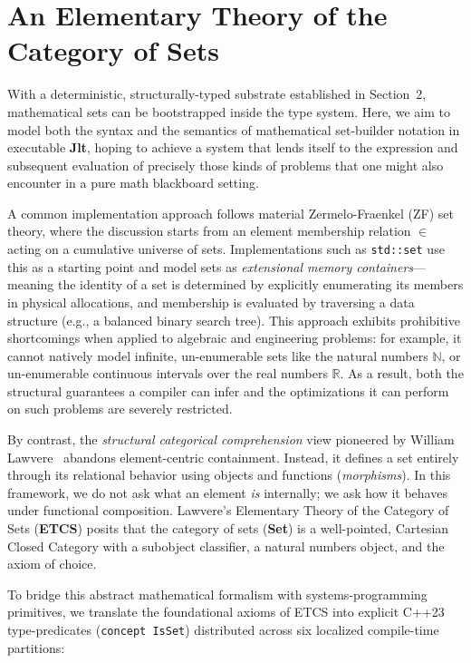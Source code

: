 \section{An Elementary Theory of the Category of Sets}
\label{sec:etcs}

With a deterministic, structurally-typed substrate established in Section~2, mathematical sets can be bootstrapped inside the type system. Here, we aim to model both the syntax and the semantics of mathematical set-builder notation in executable \textbf{Jlt}, hoping to achieve a system that lends itself to the expression and subsequent evaluation of precisely those kinds of problems that one might also encounter in a pure math blackboard setting. 

A common implementation approach follows material Zermelo-Fraenkel (ZF) set theory, where the discussion starts from an element membership relation $\in$ acting on a cumulative universe of sets. Implementations such as \texttt{std::set} use this as a starting point and model sets as \textit{extensional memory containers}---meaning the identity of a set is determined by explicitly enumerating its members in physical allocations, and membership is evaluated by traversing a data structure (e.g., a balanced binary search tree). This approach exhibits prohibitive shortcomings when applied to algebraic and engineering problems: for example, it cannot natively model infinite, un-enumerable sets like the natural numbers $\mathbb{N}$, or un-enumerable continuous intervals over the real numbers $\mathbb{R}$. As a result, both the structural guarantees a compiler can infer and the optimizations it can perform on such problems are severely restricted.

By contrast, the \textit{structural categorical comprehension} view pioneered by William Lawvere~\cite{lawvere} abandons element-centric containment. Instead, it defines a set entirely through its relational behavior using objects and functions (\textit{morphisms}). In this framework, we do not ask what an element \textit{is} internally; we ask how it behaves under functional composition. Lawvere’s Elementary Theory of the Category of Sets (\textbf{ETCS}) posits that the category of sets (\textbf{Set}) is a well-pointed, Cartesian Closed Category with a subobject classifier, a natural numbers object, and the axiom of choice.

To bridge this abstract mathematical formalism with systems-programming primitives, we translate the foundational axioms of ETCS into explicit C++23 type-predicates (\texttt{concept IsSet}) distributed across six localized compile-time partitions:

